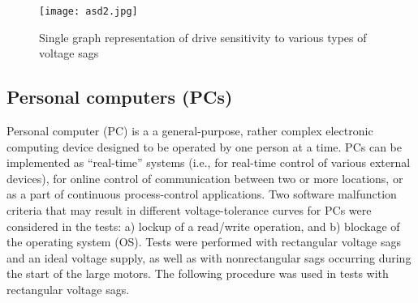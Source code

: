 \documentclass[17pt, a4paper]{extreport}
\begin{document}
 \begin{figure}
     \centering
     \texttt{[image: asd2.jpg]}
     \caption{Single graph representation of drive sensitivity to various types of voltage sags}
     \label{fig:asd_characteristics}
 \end{figure}

\subsection{Personal computers (PCs)} Personal computer (PC) is a a general-purpose, rather complex electronic computing device designed to be operated by one person at a time. PCs can be implemented as “real-time” systems (i.e., for real-time control of various external devices), for online control of communication between two or more locations, or as a part of continuous process-control applications. Two software malfunction criteria that may result in different voltage-tolerance curves for PCs were considered in the tests: a) lockup of a read/write operation, and b) blockage of the operating system (OS). Tests were performed with rectangular voltage sags and an ideal voltage supply, as well as with nonrectangular sags occurring during the start of the large motors. The following procedure was used in tests with rectangular voltage sags.
\end{document}
